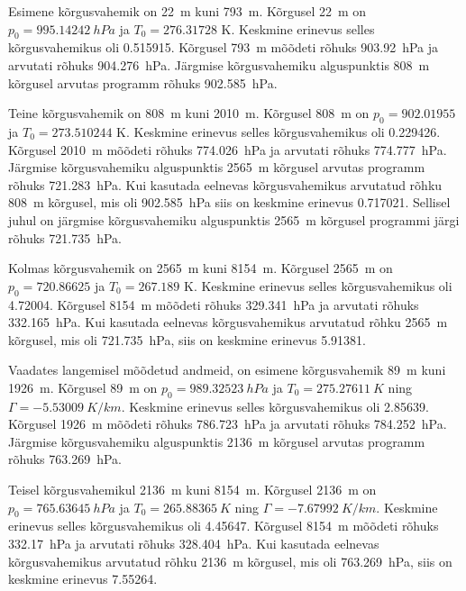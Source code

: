 \documentclass{trkut}%
\begin{document}
Esimene kõrgusvahemik on \SI{22}{m} kuni \SI{793}{m}. Kõrgusel \SI{22}{m} on $p_0=\SI{995.14242}{hPa}$ ja $T_0 = 276.31728$ K. Keskmine erinevus selles kõrgusvahemikus oli \SI{0.515915}{\permil}. Kõrgusel \SI{793}{m} mõõdeti rõhuks \SI{903.92}{hPa} ja arvutati rõhuks \SI{904.276}{hPa}. Järgmise kõrgusvahemiku alguspunktis \SI{808}{m} kõrgusel arvutas programm rõhuks \SI{902.585}{hPa}.

Teine kõrgusvahemik on \SI{808}{m} kuni \SI{2010}{m}. Kõrgusel \SI{808}{m} on $p_0 = 902.01955$ ja $T_0 = 273.510244$ K. Keskmine erinevus selles kõrgusvahemikus oli \SI{0.229426}{\permil}. Kõrgusel \SI{2010}{m} mõõdeti rõhuks \SI{774.026}{hPa} ja arvutati rõhuks \SI{774.777}{hPa}. Järgmise kõrgusvahemiku alguspunktis \SI{2565}{m} kõrgusel arvutas programm rõhuks \SI{721.283}{hPa}. Kui kasutada eelnevas kõrgusvahemikus arvutatud rõhku \SI{808}{m} kõrgusel, mis oli \SI{902.585}{hPa} siis on keskmine erinevus \SI{0.717021}{\permil}. Sellisel juhul on järgmise kõrgusvahemiku alguspunktis \SI{2565}{m} kõrgusel programmi järgi rõhuks \SI{721.735}{hPa}.

Kolmas kõrgusvahemik on \SI{2565}{m} kuni \SI{8154}{m}. Kõrgusel \SI{2565}{m} on $p_0 = 720.86625$ ja $T_0 = 267.189$ K. Keskmine erinevus selles kõrgusvahemikus oli \SI{4.72004}{\permil}. Kõrgusel \SI{8154}{m} mõõdeti rõhuks \SI{329.341}{hPa} ja arvutati rõhuks \SI{332.165}{hPa}. Kui kasutada eelnevas kõrgusvahemikus arvutatud rõhku \SI{2565}{m} kõrgusel, mis oli \SI{721.735}{hPa}, siis on keskmine erinevus \SI{5.91381}{\permil}.

Vaadates langemisel mõõdetud andmeid, on esimene kõrgusvahemik \SI{89}{m} kuni \SI{1926}{m}. Kõrgusel \SI{89}{m} on $p_0=\SI{989.32523}{hPa}$ ja $T_0 = \SI{275.27611}{K}$ ning $\Gamma = \SI{-5.53009}{K/km}$. Keskmine erinevus selles kõrgusvahemikus oli \SI{2.85639}{\permil}. Kõrgusel \SI{1926}{m} mõõdeti rõhuks \SI{786.723}{hPa} ja arvutati rõhuks \SI{784.252}{hPa}. Järgmise kõrgusvahemiku alguspunktis \SI{2136}{m} kõrgusel arvutas programm rõhuks \SI{763.269}{hPa}.

Teisel kõrgusvahemikul \SI{2136}{m} kuni \SI{8154}{m}. Kõrgusel \SI{2136}{m} on $p_0=\SI{765.63645}{hPa}$ ja $T_0 = \SI{265.88365}{K}$ ning $\Gamma = \SI{-7.67992}{K/km}$. Keskmine erinevus selles kõrgusvahemikus oli \SI{4.45647}{\permil}. Kõrgusel \SI{8154}{m} mõõdeti rõhuks \SI{332.17}{hPa} ja arvutati rõhuks \SI{328.404}{hPa}. Kui kasutada eelnevas kõrgusvahemikus arvutatud rõhku \SI{2136}{m} kõrgusel, mis oli \SI{763.269}{hPa}, siis on keskmine erinevus \SI{7.55264}{\permil}.
\end{document}
